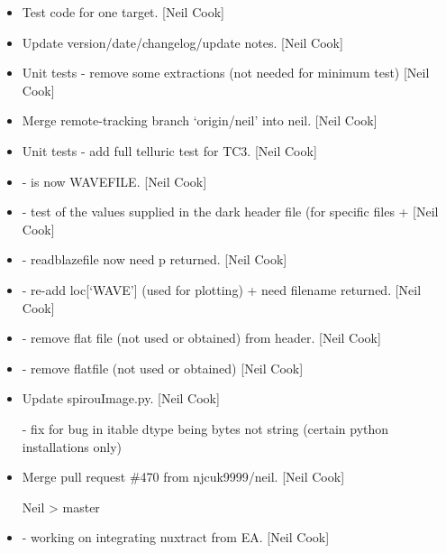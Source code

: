 \documentclass[a4paper,10pt,english]{report}
\begin{document}
\begin{itemize}
\item {} 
Test code for one target. {[}Neil Cook{]}

\item {} 
Update version/date/changelog/update notes. {[}Neil Cook{]}

\item {} 
Unit tests - remove some extractions (not needed for minimum test)
{[}Neil Cook{]}

\item {} 
Merge remote-tracking branch ‘origin/neil’ into neil. {[}Neil Cook{]}

\item {} 
Unit tests - add full telluric test for TC3. {[}Neil Cook{]}

\item {} 
 -  is now WAVEFILE. {[}Neil Cook{]}

\item {} 
 - test of the values supplied in the dark header file
(for specific files +  {[}Neil Cook{]}

\item {} 
 - readblazefile now need p returned. {[}Neil Cook{]}

\item {} 
 - re-add loc{[}‘WAVE’{]} (used for plotting) +
 need filename returned. {[}Neil Cook{]}

\item {} 
 - remove flat file (not used or obtained) from
header. {[}Neil Cook{]}

\item {} 
 - remove flatfile (not used or obtained) {[}Neil
Cook{]}

\item {} 
Update spirouImage.py. {[}Neil Cook{]}

 - fix for bug in itable dtype being bytes not string (certain python installations only)

\item {} 
Merge pull request \#470 from njcuk9999/neil. {[}Neil Cook{]}

Neil \textendash{}\textgreater{} master

\item {} 
 - working on integrating nuxtract from EA. {[}Neil
Cook{]}


\end{itemize}
\end{document}
